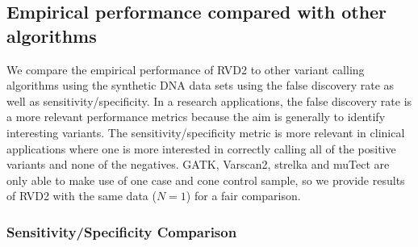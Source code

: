 \documentclass[11pt,reqno]{amsart}
\begin{document}
%


\subsection{Empirical performance compared with other algorithms}\label{sec:comparison}

We compare the empirical performance of RVD2 to other variant calling algorithms using the synthetic DNA data sets using the false discovery rate as well as sensitivity/specificity. In a research applications, the false discovery rate is a more relevant performance metrics because the aim is generally to identify interesting variants. The sensitivity/specificity metric is more relevant in clinical applications where one is more interested in correctly calling all of the positive variants and none of the negatives. GATK, Varscan2, strelka and muTect are only able to make use of one case and cone control sample, so we provide results of RVD2 with the same data ($N=1$) for a fair comparison.


\subsubsection*{Sensitivity/Specificity Comparison}
\end{document}
